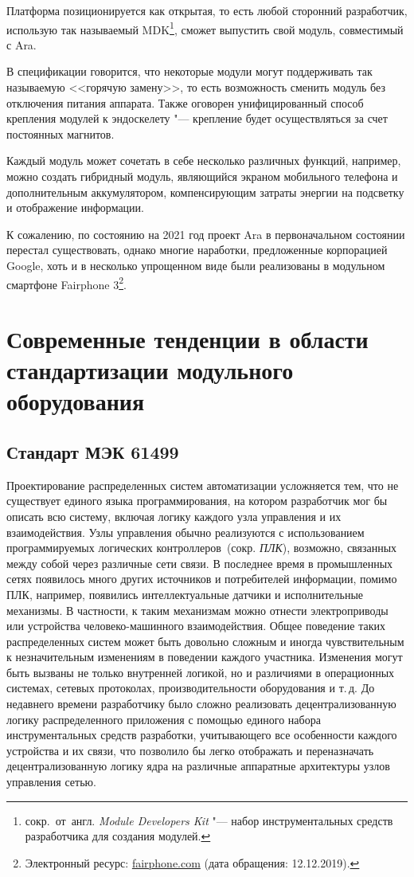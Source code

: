 Платформа позиционируется как открытая, то есть любой сторонний разработчик, использую так называемый MDK\footnote{сокр.~от~англ. \textit{Module Developers Kit} "--- набор инструментальных средств разработчика для создания модулей.}, сможет выпустить свой модуль, совместимый с Ara.

В спецификации говорится, что некоторые модули могут поддерживать так называемую <<горячую замену>>, то есть возможность сменить модуль без отключения питания аппарата. Также оговорен унифицированный способ крепления модулей к эндоскелету "--- крепление будет осуществляться за счет постоянных магнитов.

Каждый модуль может сочетать в себе несколько различных функций, например, можно создать гибридный модуль, являющийся экраном мобильного телефона и дополнительным аккумулятором, компенсирующим затраты энергии на подсветку и отображение информации.

К сожалению, по состоянию на 2021 год проект Ara в первоначальном состоянии перестал существовать, однако многие наработки, предложенные корпорацией Google, хоть и в несколько упрощенном виде были реализованы в модульном смартфоне Fairphone 3\footnote{Электронный ресурс: {\small\url{fairphone.com}} (дата обращения: 12.12.2019).}.

\section{Современные тенденции в области стандартизации модульного оборудования}

\subsection{Стандарт МЭК 61499}

Проектирование распределенных систем автоматизации усложняется тем, что не существует единого языка программирования, на котором разработчик мог бы описать всю систему, включая логику каждого узла управления и их взаимодействия. Узлы управления обычно реализуются с использованием программируемых логических контроллеров~(сокр. \textit{ПЛК}), возможно, связанных между собой через различные сети связи. В последнее время в промышленных сетях появилось много других источников и потребителей информации, помимо ПЛК, например, появились интеллектуальные датчики и исполнительные механизмы. В частности, к таким механизмам можно отнести электроприводы или устройства человеко-машинного взаимодействия. Общее поведение таких распределенных систем может быть довольно сложным и иногда чувствительным к незначительным изменениям в поведении каждого участника. Изменения могут быть вызваны не только внутренней логикой, но и различиями в операционных системах, сетевых протоколах, производительности оборудования и т.\,д. До недавнего времени разработчику было сложно реализовать децентрализованную логику распределенного приложения с помощью единого набора инструментальных средств разработки, учитывающего все особенности каждого устройства и их связи, что позволило бы легко отображать и переназначать децентрализованную логику ядра на различные аппаратные архитектуры узлов управления сетью.

